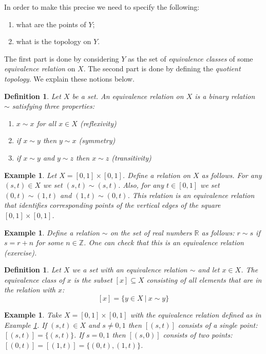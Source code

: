 \documentclass[11pt, letterpaper, oneside]{report}
\theoremstyle{pplain}
\newtheorem{ITERMVALUE THM}[theorem]{Intermediate Value Theorem}
\newtheorem{HEINEBOREL THM}[theorem]{Heine-Borel Theorem}
\newtheorem{UMETR THM}[theorem]{Urysohn Metrization Theorem}
\newtheorem{UMETR2 THM}[theorem]{Urysohn Metrization Theorem (v.2)}
\theoremstyle{ddefinition}
\newtheorem{definition}[theorem]{Definition}
\newtheorem{example}[theorem]{Example}
\theoremstyle{nnn}
\newtheorem{TDA NN}[theorem]{Topological Data Analysis. }
\theoremstyle{eexercise}
\newcommand{\Z}{{\mathbb Z}}
\newcommand{\R}{{\mathbb R}}
\newcommand{\benu}{\begin{enumerate}}
\newcommand{\eenu}{\end{enumerate}}
\begin{document}
In order to make this precise we need to specify the following:
\benu
\item what are the points of $Y$; 
\item what is the topology on $Y$. 
\eenu

The first part is done by considering $Y$ as  the set of \emph{equivalence classes} of some 
\emph{equivalence relation} on $X$. The second part is done by defining the 
\emph{quotient topology}. We explain these notions below. 

\begin{definition}
Let $X$ be a set. An \emph{equivalence relation on $X$} is a binary relation $\sim$ satisfying three 
properties:
\benu
\item $x\sim x$ for all $x\in X$ (reflexivity)
\item if $x\sim y$ then $y\sim x$ (symmetry)
\item  if $x\sim y$ and $y\sim z$ then $x\sim z$ (transitivity)
\eenu
\end{definition}

\begin{example}
\label{EQUIV REL1 EXAMPLE}
Let $X = [0, 1]\times [0, 1]$. Define a relation on $X$ as follows. For any $(s,t)\in X$ we set 
$(s,t)\sim (s,t)$. Also, for any $t\in [0,1]$ we set $(0,t)\sim (1,t)$ and $(1,t)\sim (0,t)$. This relation is 
an equivalence relation that identifies corresponding points of the vertical edges of the square 
$[0, 1]\times [0,1]$.
\end{example}

\begin{example}
\label{EQUIV REL2 EXAMPLE}
Define a relation $\sim$ on the set of real numbers $\R$ as follows: $r\sim s$  if $s = r+n$
for some $n\in \Z$. One can check that this is an equivalence relation (exercise). 
\end{example}

\begin{definition}
Let $X$ we a set with an equivalence relation $\sim$ and let $x\in X$. The \emph{equivalence class}
of $x$ is the subset $[x]\subseteq X$ consisting of all elements that are in the relation with $x$:
$$[x] = \{ y\in X \ | \ x\sim y\}$$ 
\end{definition}

\begin{example}
Take $X= [0,1]\times [0,1]$ with the equivalence relation defined as in Example \ref{EQUIV REL1 EXAMPLE}. 
If $(s, t)\in X$ and $s\neq 0,1$ then $[(s,t)]$ consists of a single point: $[(s,t)] = \{(s,t)\}$. 
If $s = 0,1$ then $[(s,0)]$ consists of two points: $[(0,t)] = [(1,t)] = \{(0,t), (1,t)\}$.  
\end{example}
\end{document}
